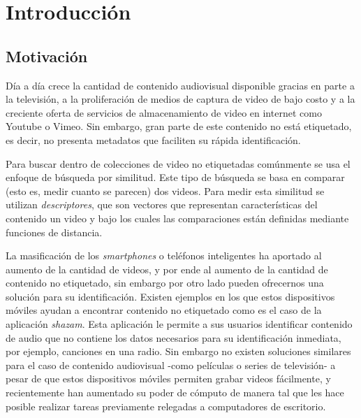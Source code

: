\chapter{Introducción} \label{intro}

\section{Motivación} \label{motivacion}


Día a día crece la cantidad de contenido audiovisual disponible gracias en parte a la televisión, a la proliferación de medios de captura de video de bajo costo y a la creciente oferta de servicios de almacenamiento de video en internet como Youtube o Vimeo.
Sin embargo, gran parte de este contenido no está etiquetado, es decir, no presenta metadatos que faciliten su rápida identificación. 

Para buscar dentro de colecciones de video no etiquetadas comúnmente se usa el enfoque de búsqueda por similitud. Este tipo de búsqueda se basa en comparar (esto es, medir cuanto se parecen) dos videos. Para medir esta similitud se utilizan \emph{descriptores}, que son vectores que representan características del contenido un video y bajo los cuales las comparaciones están definidas mediante funciones de distancia.

La masificación de los \emph{smartphones} o teléfonos inteligentes ha aportado al aumento de la cantidad de videos, y por ende al aumento de la cantidad de contenido no etiquetado, sin embargo por otro lado pueden ofrecernos una solución para su identificación. Existen ejemplos en los que estos dispositivos móviles ayudan a encontrar contenido no etiquetado como es el caso de la aplicación \emph{shazam}. Esta aplicación le permite a sus usuarios identificar contenido de audio que no contiene los datos necesarios para su identificación inmediata, por ejemplo, canciones en una radio. Sin embargo no existen soluciones similares para el caso de contenido audiovisual -como películas o series de televisión- a pesar de que estos dispositivos móviles permiten grabar videos fácilmente, y recientemente han aumentado su poder de cómputo de manera tal que les hace posible realizar tareas previamente relegadas a computadores de escritorio. 

